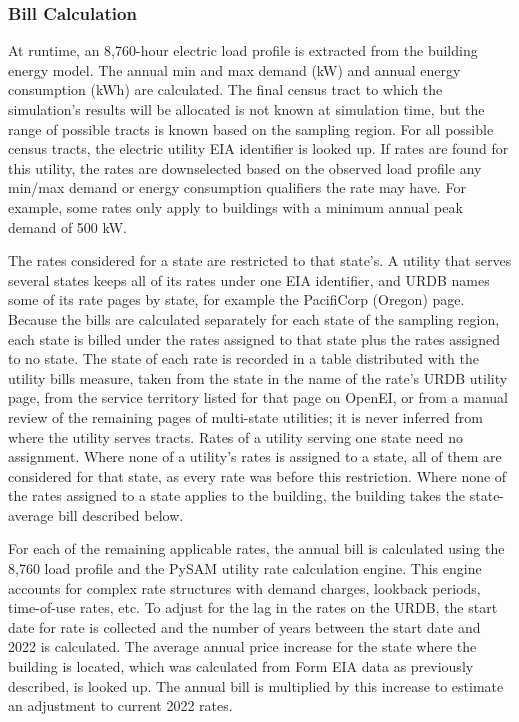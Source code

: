 \subsubsection{Bill Calculation}
At runtime, an 8,760-hour electric load profile is extracted from the building energy model. The annual min and max demand (kW) and annual energy consumption (kWh) are calculated. The final census tract to which the simulation's results will be allocated is not known at simulation time, but the range of possible tracts is known based on the sampling region. For all possible census tracts, the electric utility EIA identifier is looked up. If rates are found for this utility, the rates are downselected based on the observed load profile any min/max demand or energy consumption qualifiers the rate may have. For example, some rates only apply to buildings with a minimum annual peak demand of 500 kW.

The rates considered for a state are restricted to that state's. A utility that serves several states keeps all of its rates under one EIA identifier, and URDB names some of its rate pages by state, for example the PacifiCorp (Oregon) page. Because the bills are calculated separately for each state of the sampling region, each state is billed under the rates assigned to that state plus the rates assigned to no state. The state of each rate is recorded in a table distributed with the utility bills measure, taken from the state in the name of the rate's URDB utility page, from the service territory listed for that page on OpenEI, or from a manual review of the remaining pages of multi-state utilities; it is never inferred from where the utility serves tracts. Rates of a utility serving one state need no assignment. Where none of a utility's rates is assigned to a state, all of them are considered for that state, as every rate was before this restriction. Where none of the rates assigned to a state applies to the building, the building takes the state-average bill described below.

For each of the remaining applicable rates, the annual bill is calculated using the 8,760 load profile and the PySAM utility rate calculation engine. This engine accounts for complex rate structures with demand charges, lookback periods, time-of-use rates, etc. To adjust for the lag in the rates on the URDB, the start date for rate is collected and the number of years between the start date and 2022 is calculated. The average annual price increase for the state where the building is located, which was calculated from Form EIA data as previously described, is looked up. The annual bill is multiplied by this increase to estimate an adjustment to current 2022 rates.

